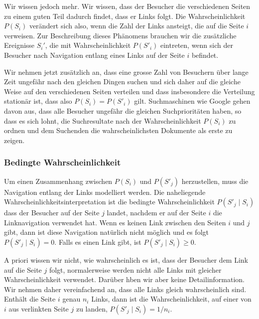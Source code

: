 Wir wissen jedoch mehr.
Wir wissen, dass der Besucher die verschiedenen Seiten zu einem guten 
Teil dadurch findet, dass er Links folgt.
Die Wahrscheinlichkeit $P(S_i)$ verändert sich also, wenn die Zahl der
Links ansteigt, die auf die Seite $i$ verweisen.
Zur Beschreibung dieses Phänomens brauchen wir die zusätzliche Ereignisse
$S_i'$, die mit Wahrscheinlichkeit $P(S'_i)$ eintreten, wenn sich der
Besucher nach Navigation entlang eines Links auf der Seite $i$ befindet.

Wir nehmen jetzt zusätzlich an, dass eine grosse Zahl von Besuchern über
lange Zeit ungefähr nach den gleichen Dingen suchen und sich daher
auf die gleiche Weise auf den verschiedenen Seiten verteilen und dass
insbesondere die Verteilung stationär ist, dass also $P(S_i) = P(S'_i)$
gilt.
%
Suchmaschinen wie Google gehen davon aus, dass alle Besucher ungefähr
%
die gleichen Suchprioritäten haben, so dass es sich lohnt, die Suchresultate
nach der Wahrscheinlichkeit $P(S_i)$ zu ordnen und dem Suchenden die
wahrscheinlichsten Dokumente als erste zu zeigen.

\subsubsection{Bedingte Wahrscheinlichkeit}
Um einen Zusammenhang zwischen $P(S_i)$ und $P(S'_j)$ herzustellen, muss
die Navigation entlang der Links modelliert werden.
Die naheliegende Wahrscheinlichkeitsinterpretation ist die bedingte
Wahrscheinlichkeit $P(S'_j\mid S_i)$ dass der Besucher auf der Seite $j$
landet, nachdem er auf der Seite $i$ die Linknavigation verwendet hat.
Wenn es keinen Link zwischen den Seiten $i$ und $j$ gibt, dann ist diese
Navigation natürlich nicht möglich und es folgt $P(S'_j\mid S_i)=0$.
Falls es einen Link gibt, ist $P(S'_j\mid S_i)\ge 0$.

A priori wissen wir nicht, wie wahrscheinlich es ist, dass der Besucher
dem Link auf die Seite $j$ folgt, normalerweise werden nicht alle
Links mit gleicher Wahrscheinlichkeit verwendet.
Darüber hben wir aber keine Detailinformation.
Wir nehmen daher vereinfachend an, dass alle Links gleich wahrscheinlich
sind.
Enthält die Seite $i$ genau $n_i$ Links, dann ist die Wahrscheinlichkeit,
auf einer von $i$ aus verlinkten Seite $j$ zu landen, $P(S'_j\mid S_i) = 1/n_i$.

